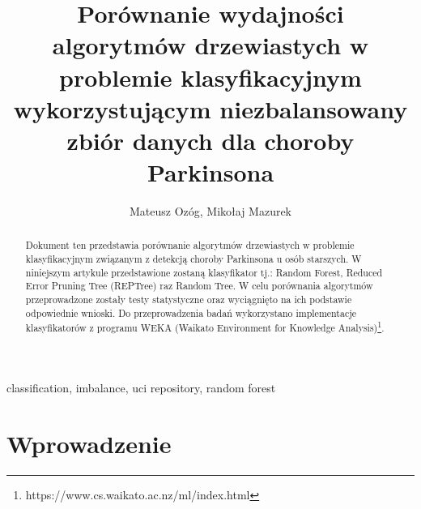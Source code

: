 \documentclass[conference]{IEEEtran}
\begin{document}
\title{Porównanie wydajności algorytmów drzewiastych w problemie klasyfikacyjnym wykorzystującym niezbalansowany zbiór danych dla choroby Parkinsona}

\author{Mateusz Ozóg, Mikołaj Mazurek}

\maketitle

\begin{abstract}
Dokument ten przedstawia porównanie algorytmów drzewiastych w problemie klasyfikacyjnym związanym z detekcją choroby Parkinsona u osób starszych. W niniejszym artykule przedstawione zostaną klasyfikator tj.: Random Forest, Reduced Error Pruning Tree (REPTree) raz Random Tree. W celu porównania algorytmów przeprowadzone zostały testy statystyczne oraz wyciągnięto na ich podstawie odpowiednie wnioski. Do przeprowadzenia badań wykorzystano implementacje klasyfikatorów z programu WEKA (Waikato Environment for Knowledge Analysis)\footnote{https://www.cs.waikato.ac.nz/ml/index.html}.
\end{abstract}

\begin{IEEEkeywords}
classification, imbalance, uci repository, random forest
\end{IEEEkeywords}

\section{Wprowadzenie}
\end{document}
